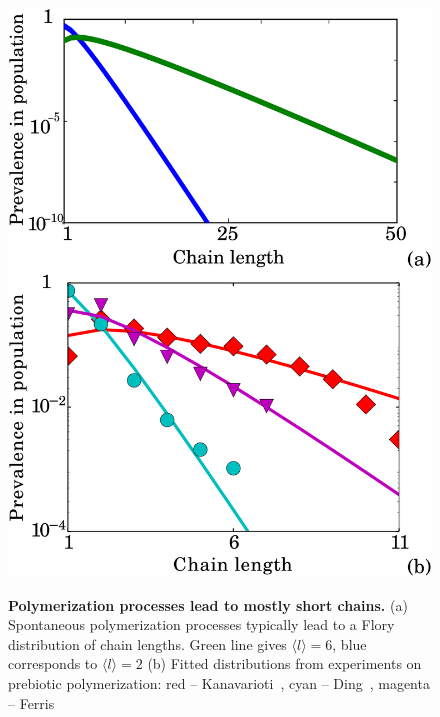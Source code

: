 \documentclass[5p,times]{elsarticle}
\begin{document}
\begin{figure}[h!]
  \centering
  \includegraphics[width=0.9\columnwidth]{pictures/flory-two.pdf} \\
  \caption{\textbf{Polymerization processes lead to mostly short chains.} (a)  Spontaneous 
polymerization processes typically lead to a Flory distribution of chain lengths. 
Green line gives $\langle  l \rangle= 6$, blue corresponds to $\langle l \rangle=2$
(b) Fitted distributions from experiments on prebiotic polymerization: red -- 
Kanavarioti~\cite{Kanavarioti2001}, cyan -- Ding~\cite{Ding1996}, 
magenta -- Ferris~\cite{Ferris1999}}
  \label{fig:flory}
\end{figure}

\end{document}
